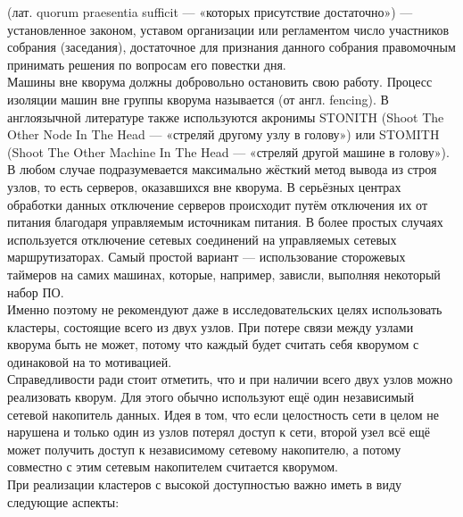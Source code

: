 \documentclass[14pt, a4paper]{article}
\begin{document}
\href{https://ru.wikipedia.org/wiki/Кворум}{} (лат. quorum praesentia sufficit — «которых присутствие достаточно») — установленное
законом, уставом организации или регламентом число участников собрания (заседания), достаточное
для признания данного собрания правомочным принимать решения по вопросам его повестки дня.\\

Машины вне кворума должны добровольно остановить свою работу. Процесс изоляции машин вне
группы кворума называется \href{https://en.wikipedia.org/wiki/Fencing_(computing).}{} (от англ. fencing). В англоязычной литературе также
используются акронимы STONITH (Shoot The Other Node In The Head — «стреляй другому узлу в
голову») или STOMITH (Shoot The Other Machine In The Head — «стреляй другой машине в голову»). В
любом случае подразумевается максимально жёсткий метод вывода из строя узлов, то есть серверов,
оказавшихся вне кворума. В серьёзных центрах обработки данных отключение серверов происходит
путём отключения их от питания благодаря управляемым источникам питания. В более простых
случаях используется отключение сетевых соединений на управляемых сетевых маршрутизаторах.
Самый простой вариант — использование сторожевых таймеров на самих машинах, которые,
например, зависли, выполняя некоторый набор ПО.\\

Именно поэтому не рекомендуют даже в исследовательских целях использовать кластеры, состоящие
всего из двух узлов. При потере связи между узлами кворума быть не может, потому что каждый будет
считать себя кворумом с одинаковой на то мотивацией.\\

Справедливости ради стоит отметить, что и при наличии всего двух узлов можно реализовать кворум.
Для этого обычно используют ещё один независимый сетевой накопитель данных. Идея в том, что
если целостность сети в целом не нарушена и только один из узлов потерял доступ к сети, второй
узел всё ещё может получить доступ к независимому сетевому накопителю, а потому совместно с
этим сетевым накопителем считается кворумом.\\

При реализации кластеров с высокой доступностью важно иметь в виду следующие аспекты:
\end{document}
